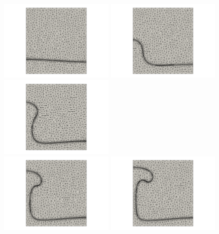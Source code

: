 \begin{center}
\includegraphics[width=5.5cm]{python_codes/fieldstone_95/results/npsurf250/grid0000.png}
\includegraphics[width=5.5cm]{python_codes/fieldstone_95/results/npsurf250/grid0050.png}
\includegraphics[width=5.5cm]{python_codes/fieldstone_95/results/npsurf250/grid0100.png}\\
\includegraphics[width=5.5cm]{python_codes/fieldstone_95/results/npsurf250/grid0150.png}
\includegraphics[width=5.5cm]{python_codes/fieldstone_95/results/npsurf250/grid0200.png}

\end{center}
